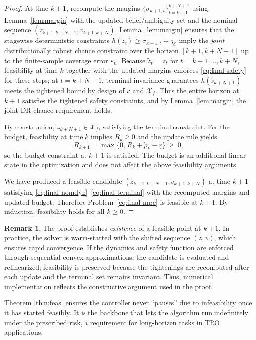 \documentclass[journal]{IEEEtran}
\theoremstyle{definition}
\newtheorem{remark}{Remark}
\begin{document}
\begin{proof}
 
At time $k{+}1$, recompute the margins $\{\sigma_{k+1,t}\}_{t=k+1}^{k+N+1}$ using
Lemma~\ref{lem:margin} with the updated belief/ambiguity set and the nominal sequence
$(\tilde z_{k+1:k+N+1},\tilde v_{k+1:k+N})$.
Lemma~\ref{lem:margin} ensures that the stagewise deterministic constraints
$h(\tilde z_t)\ge \sigma_{k+1,t}+\eta_{\mathcal{E}}$ imply the \emph{joint}
distributionally robust chance constraint over the horizon $[k{+}1,k{+}N{+}1]$ up to the
finite-sample coverage error $\varepsilon_n$. Because $\tilde z_t=z_t$ for
$t=k{+}1,\dots,k{+}N$, feasibility at time $k$ together with the updated margins enforces
\eqref{eq:final-safety} for these steps; at $t=k{+}N{+}1$, terminal invariance guarantees
$h(\tilde z_{k+N+1})$ meets the tightened bound by design of $\kappa$ and $\mathcal{X}_f$.
Thus the entire horizon at $k{+}1$ satisfies the tightened safety constraints, and by
Lemma~\ref{lem:margin} the joint DR chance requirement holds.

 
By construction, $\tilde z_{k+N+1}\in\mathcal{X}_f$, satisfying the terminal constraint.
For the budget, feasibility at time $k$ implies $R_k\ge 0$ and the update rule yields
\[
R_{k+1}=\max\{0,\,R_k+\widetilde\rho_k-\underline r\}\ \ge\ 0,
\]
so the budget constraint at $k{+}1$ is satisfied. The budget is an additional linear
state in the optimization and does not affect the above feasibility arguments.

 
We have produced a feasible candidate $(\tilde z_{k+1:k+N+1},\tilde v_{k+1:k+N})$ at time
$k{+}1$ satisfying \eqref{eq:final-nomdyn}--\eqref{eq:final-terminal} with the recomputed
margins and updated budget. Therefore Problem~\eqref{eq:final-mpc} is feasible at $k{+}1$.
By induction, feasibility holds for all $k\ge 0$.
\end{proof}

\begin{remark} 
The proof establishes \emph{existence} of a feasible point at $k{+}1$. In practice, the solver is
warm-started with the shifted sequence $(\tilde z,\tilde v)$, which ensures rapid convergence.
If the dynamics and safety function are enforced through sequential convex approximations,
the candidate is evaluated and relinearized; feasibility is preserved because the tightenings
are recomputed after each update and the terminal set remains invariant. Thus, numerical implementation
reflects the constructive argument used in the proof.
\end{remark}


 
Theorem \ref{thm:feas} ensures the controller never ``pauses'' due to infeasibility once it has started feasibly. It is the backbone that lets the algorithm run indefinitely under the prescribed risk, a requirement for long-horizon tasks in TRO applications.
\end{document}
